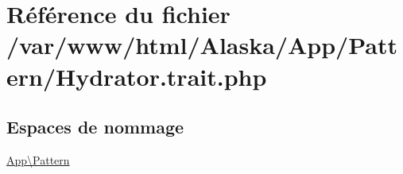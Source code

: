 \hypertarget{_hydrator_8trait_8php}{}\section{Référence du fichier /var/www/html/\+Alaska/\+App/\+Pattern/\+Hydrator.trait.\+php}
\label{_hydrator_8trait_8php}
\subsection*{Espaces de nommage}
\begin{DoxyCompactItemize}
\item 
 \hyperlink{namespace_app_1_1_pattern}{App\textbackslash{}\+Pattern}
\end{DoxyCompactItemize}
